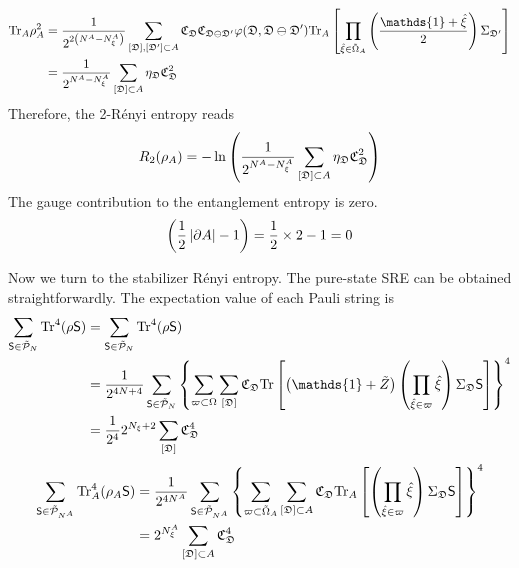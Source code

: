 \begin{align*}
    \Tr_A\rho_A^2
    &=
    \frac{1}{2^{2\lr{N^A - N^A_\xi}}}
    \sum_{[\mathfrak{D}],[\mathfrak{D}']\subset A}
    \mathfrak{C}_\mathfrak{D}\mathfrak{C}_{\mathfrak{D}\ominus\mathfrak{D}'}
    \varphi(\mathfrak{D},\mathfrak{D}\ominus\mathfrak{D}')
    \Tr_A\lrm{
        \prod_{\hat{\xi} \in \tilde{\Omega}_A}
        \lr{\frac{\mathds{1} + \hat{\xi}}{2}}
        \Sigma_{\mathfrak{D}'}
    }
    \\
    &=
    \frac{1}{2^{N^A - N^A_\xi}}
    \sum_{[\mathfrak{D}]\subset A} \eta_\mathfrak{D} \mathfrak{C}_\mathfrak{D}^2
\end{align*}
Therefore, the 2-R\'enyi entropy reads
\begin{equation}
    R_2(\rho_A)
    =
    -\ln\left( 
    \frac{1}{2^{N^A - N^A_\xi}}
    \sum_{[\mathfrak{D}] \subset A} \eta_\mathfrak{D}\mathfrak{C}_\mathfrak{D}^2
     \right)
\end{equation}
The gauge contribution to the entanglement entropy is zero.
\[
    \left( \frac{1}{2}\left| \partial A \right| - 1 \right) = \frac{1}{2}\times 2 - 1 = 0
\]

Now we turn to the stabilizer R\'enyi entropy. The pure-state SRE can be obtained straightforwardly. The expectation value of each Pauli string is
\begin{align*}
    \sum_{\mathsf{S}\in\tilde{\mathcal{P}}_{N}} \Tr^4 (\rho \mathsf{S})
    &=
    \sum_{\mathsf{S}\in\tilde{\mathcal{P}}_{N}} \Tr^4 (\rho \mathsf{S}) \\
    &=
    \frac{1}{2^{4N + 4}}
    \sum_{\mathsf{S} \in \tilde{\mathcal{P}}_{N}}
    \lrg{
        \sum_{\varpi \subset \Omega}
        \sum_{[\mathfrak{D}]}
        \mathfrak{C}_\mathfrak{D}
        \Tr\lrm{
            \lr{\mathds{1} + \tilde{Z}}
            \lr{\prod_{\hat{\xi}\in\varpi}\hat{\xi}}
            \Sigma_\mathfrak{D}
            \mathsf{S}
        }
    }^4 \\
    &=
    \frac{1}{2^{4}} 
    2^{N_\xi + 2}   \sum_{[\mathfrak{D}]} \mathfrak{C}_\mathfrak{D}^4
\end{align*}
\begin{align*}
    \sum_{\mathsf{S}\in\tilde{\mathcal{P}}_{N^A}} \mathrm{Tr}_A^4 (\rho_A \mathsf{S})
    &=
    \frac{1}{2^{4N^A}}
    \sum_{\mathsf{S} \in \tilde{\mathcal{P}}_{N^A}}
    \left\{ 
        \sum_{\varpi \subset \tilde{\Omega}_A}
        \sum_{[\mathfrak{D}]\subset A}
        \mathfrak{C}_\mathfrak{D}
        \mathrm{Tr}_A\left[ 
            \left( \prod_{\hat{\xi}\in\varpi}\hat{\xi} \right)
            \Sigma_\mathfrak{D}
            \mathsf{S}
         \right]
     \right\}^4 \\
    &=
    2^{N_\xi^A}
    \sum_{[\mathfrak{D}]\subset A} \mathfrak{C}_\mathfrak{D}^4
\end{align*}


